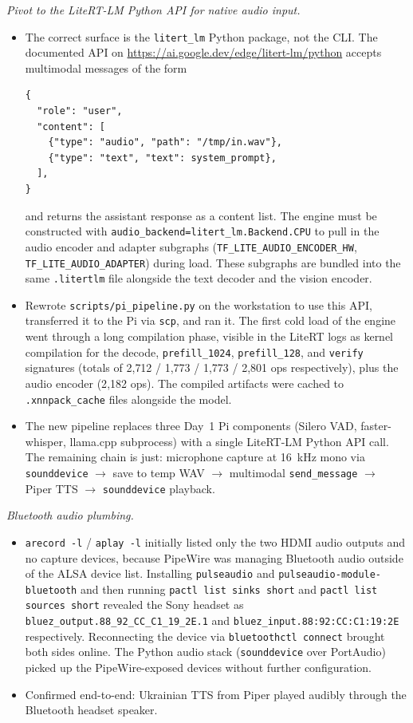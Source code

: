 \documentclass{article}
\theoremstyle{plain}
\theoremstyle{definition}
\theoremstyle{remark}
\begin{document}
\textit{Pivot to the LiteRT-LM Python API for native audio input.}
\begin{itemize}
\item The correct surface is the \texttt{litert\_lm} Python package, not the CLI. The documented API on \url{https://ai.google.dev/edge/litert-lm/python} accepts multimodal messages of the form
\begin{verbatim}
{
  "role": "user",
  "content": [
    {"type": "audio", "path": "/tmp/in.wav"},
    {"type": "text", "text": system_prompt},
  ],
}
\end{verbatim}
    and returns the assistant response as a content list. The engine must be constructed with \texttt{audio\_backend=litert\_lm.Backend.CPU} to pull in the audio encoder and adapter subgraphs (\texttt{TF\_LITE\_AUDIO\_ENCODER\_HW}, \texttt{TF\_LITE\_AUDIO\_ADAPTER}) during load. These subgraphs are bundled into the same \texttt{.litertlm} file alongside the text decoder and the vision encoder.
\item Rewrote \texttt{scripts/pi\_pipeline.py} on the workstation to use this API, transferred it to the Pi via \texttt{scp}, and ran it. The first cold load of the engine went through a long compilation phase, visible in the LiteRT logs as kernel compilation for the decode, \texttt{prefill\_1024}, \texttt{prefill\_128}, and \texttt{verify} signatures (totals of 2{,}712 / 1{,}773 / 1{,}773 / 2{,}801 ops respectively), plus the audio encoder (2{,}182 ops). The compiled artifacts were cached to \texttt{.xnnpack\_cache} files alongside the model.
\item The new pipeline replaces three Day~1 Pi components (Silero VAD, faster-whisper, llama.cpp subprocess) with a single LiteRT-LM Python API call. The remaining chain is just: microphone capture at 16~kHz mono via \texttt{sounddevice} $\rightarrow$ save to temp WAV $\rightarrow$ multimodal \texttt{send\_message} $\rightarrow$ Piper TTS $\rightarrow$ \texttt{sounddevice} playback.
\end{itemize}

\textit{Bluetooth audio plumbing.}
\begin{itemize}
\item \texttt{arecord -l} / \texttt{aplay -l} initially listed only the two HDMI audio outputs and no capture devices, because PipeWire was managing Bluetooth audio outside of the ALSA device list. Installing \texttt{pulseaudio} and \texttt{pulseaudio-module-bluetooth} and then running \texttt{pactl list sinks short} and \texttt{pactl list sources short} revealed the Sony headset as \texttt{bluez\_output.88\_92\_CC\_C1\_19\_2E.1} and \texttt{bluez\_input.88:92:CC:C1:19:2E} respectively. Reconnecting the device via \texttt{bluetoothctl connect} brought both sides online. The Python audio stack (\texttt{sounddevice} over PortAudio) picked up the PipeWire-exposed devices without further configuration.
\item Confirmed end-to-end: Ukrainian TTS from Piper played audibly through the Bluetooth headset speaker.
\end{itemize}
\end{document}
